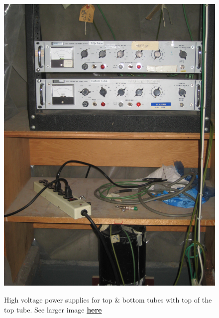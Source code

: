 \documentclass{../lab}
\begin{document}
\begin{figure}[h]
\begin{minipage}{0.18\textwidth}
    \href{http://experimentationlab.berkeley.edu/sites/default/files/images/MUO_Pwr_3562.jpg}{\includegraphics[width=\linewidth,keepaspectratio]{images/MUO_Pwr_3562.jpg}}
    \caption{High voltage power supplies for top \& bottom tubes with top of the top tube. See larger image \href{http://experimentationlab.berkeley.edu/sites/default/files/images/MUO_Pwr_3562.jpg}{\textbf{here}}}
\end{minipage}
\begin{minipage}{0.20\textwidth}

\end{minipage}
\end{figure}
\end{document}
